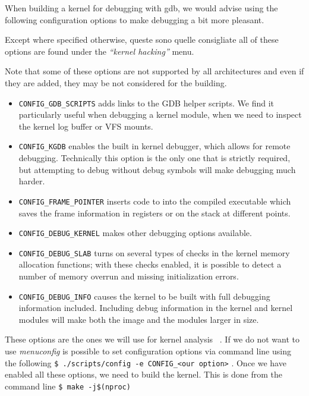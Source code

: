 \documentclass{masterthesis}
\begin{document}
When building a kernel for debugging with gdb, we would advise using the following configuration options to make debugging a bit more pleasant. 

Except where specified otherwise, queste sono quelle consigliate all of these options are found under the \emph{``kernel hacking''} menu.


Note that some of these options are not supported by all architectures and even if they are added, they may be not considered for the building.
\begin{itemize}
\item \texttt{CONFIG\_GDB\_SCRIPTS} adds links to the GDB helper scripts. We find it particularly useful when debugging a kernel module, when we need to inspect the kernel log buffer or VFS mounts.

\item \texttt{CONFIG\_KGDB} enables the built in kernel debugger, which allows for remote debugging. Technically this option is the only one that is strictly required, but attempting to debug without debug symbols will make debugging much harder.

\item \texttt{CONFIG\_FRAME\_POINTER} inserts code to into the compiled executable which saves the frame information in registers or on the stack at different points.

\item \texttt{CONFIG\_DEBUG\_KERNEL} makes other debugging options available.

\item \texttt{CONFIG\_DEBUG\_SLAB} turns on several types of checks in the kernel memory allocation functions; with these checks enabled, it is possible to detect a number of memory overrun and missing initialization errors.

\item \texttt{CONFIG\_DEBUG\_INFO} causes the kernel to be built with full debugging information included. Including debug information in the kernel and kernel modules will make both the image and the modules larger in size.
\end{itemize}
These options are the ones we will use for kernel analysis ~\cite{kernel_analysis}.
If we do not want to use \textit{menuconfig} is possible to set configuration options via command line using the following
\lstinline{$ ./scripts/config -e CONFIG_<our option>} .
Once we have enabled all these options, we need to build the kernel.
This is done from the command line \lstinline{$ make -j$(nproc)}
\end{document}
